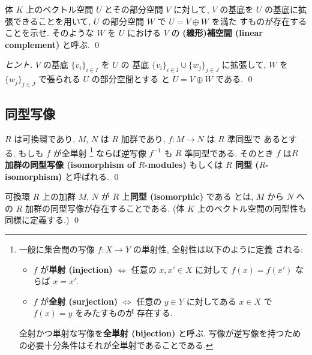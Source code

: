 \documentclass[12pt,twoside]{jarticle}
\begin{document}

\begin{question}[補空間の存在]
  \label{q:complement}
  体 $K$ 上のベクトル空間 $U$ とその部分空間 $V$ に対して, $V$ の基底を $U$ 
  の基底に拡張できることを用いて, $U$ の部分空間 $W$ で $U=V\oplus W$ を満た
  すものが存在することを示せ. 
  そのような $W$ を $U$ における $V$ の
  {\bf (線形)補空間 (linear complement)} と呼ぶ.
  \qed
\end{question}

\begin{proof}[ヒント]
  $V$ の基底 $\{v_i\}_{i\in I}$ を $U$ の
  基底 $\{v_i\}_{i\in I}\cup\{w_j\}_{j\in J}$ に拡張して,
  $W$ を $\{w_j\}_{j\in J}$ で張られる $U$ の部分空間とする
  と $U=V\oplus W$ である.
  \qed
\end{proof}


\subsection{同型写像}
\label{sec:isomorphism}


\begin{question}[同型写像の定義]
  $R$ は可換環であり, $M$, $N$ は $R$ 加群であり, $f:M\to N$ は $R$ 準同型で
  あるとする.  もしも $f$ が全単射%
  \footnote{一般に集合間の写像 $f:X\to Y$ の単射性, 全射性は以下のように定義
    される:
    \begin{itemize}
    \item $f$ が{\bf 単射 (injection)} $\iff$ 
      任意の $x,x'\in X$ に対して $f(x)=f(x')$ ならば $x=x'$.
    \item $f$ が{\bf 全射 (surjection)} $\iff$
      任意の $y\in Y$ に対してある $x\in X$ で $f(x)=y$ をみたすものが
      存在する.
    \end{itemize}
    全射かつ単射な写像を{\bf 全単射 (bijection)} と呼ぶ.
    写像が逆写像を持つための必要十分条件はそれが全単射であることである.}%
  ならば逆写像 $f^{-1}$ も $R$ 準同型である.
  そのとき $f$ は{\bf $R$ 加群の同型写像 (isomorphism of $R$-modules)} 
  もしくは {\bf $R$ 同型 ($R$-isomorphism)} と呼ばれる.
  \qed
\end{question}


\begin{definition}[$R$ 加群の同型性]
  可換環 $R$ 上の加群 $M$, $N$ が $R$ 上{\bf 同型 (isomorphic)} である
  とは, $M$ から $N$ への $R$ 加群の同型写像が存在することである.
  (体 $K$ 上のベクトル空間の同型性も同様に定義する.)
  \qed
\end{definition}
\end{document}
